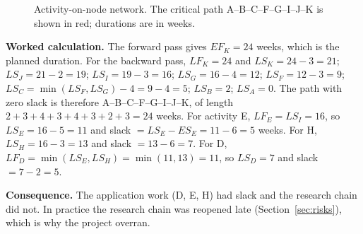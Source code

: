 \begin{figure}[!t]
\centering
{}
\caption{Activity-on-node network. The critical path A--B--C--F--G--I--J--K is shown in red; durations are in weeks.}
\label{fig:network}
\end{figure}

\noindent\textbf{Worked calculation.} The forward pass gives $EF_K=24$ weeks, which is the planned duration. For the backward pass, $LF_K=24$ and $LS_K=24-3=21$; $LS_J=21-2=19$; $LS_I=19-3=16$; $LS_G=16-4=12$; $LS_F=12-3=9$; $LS_C=\min(LS_F,LS_G)-4=9-4=5$; $LS_B=2$; $LS_A=0$. The path with zero slack is therefore A--B--C--F--G--I--J--K, of length $2+3+4+3+4+3+2+3=24$ weeks. For activity E, $LF_E=LS_I=16$, so $LS_E=16-5=11$ and slack $=LS_E-ES_E=11-6=5$ weeks. For H, $LS_H=16-3=13$ and slack $=13-6=7$. For D, $LF_D=\min(LS_E,LS_H)=\min(11,13)=11$, so $LS_D=7$ and slack $=7-2=5$.

\noindent\textbf{Consequence.} The application work (D, E, H) had slack and the research chain did not. In practice the research chain was reopened late (Section~\ref{sec:risks}), which is why the project overran.

